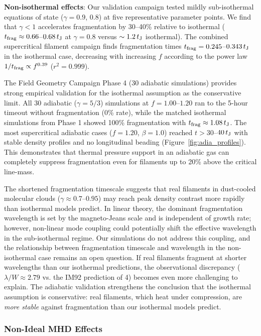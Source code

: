 \documentclass[twoside,twocolumn]{mnras}
\begin{document}
\textbf{Non-isothermal effects}: Our validation campaign tested mildly sub-isothermal equations of state ($\gamma = 0.9$, $0.8$) at five representative parameter points. We find that $\gamma < 1$ accelerates fragmentation by 30--40\% relative to isothermal ($t_{\rm frag} \approx 0.66$--$0.68\,t_{\rm J}$ at $\gamma = 0.8$ versus $\sim 1.2\,t_{\rm J}$ isothermal). The combined supercritical filament campaign finds fragmentation times $t_{\rm frag} = 0.245$--$0.343\,t_{\rm J}$ in the isothermal case, decreasing with increasing $f$ according to the power law $1/t_{\rm frag} \propto f^{0.39}$ ($r^2 = 0.999$).

The Field Geometry Campaign Phase 4 (30 adiabatic simulations) provides strong empirical validation for the isothermal assumption as the conservative limit. All 30 adiabatic ($\gamma = 5/3$) simulations at $f = 1.00$--$1.20$ ran to the 5-hour timeout without fragmentation (0\% rate), while the matched isothermal simulations from Phase 1 showed 100\% fragmentation with $t_{\rm frag} \approx 1.08\,t_{\rm J}$. The most supercritical adiabatic cases ($f = 1.20$, $\beta = 1.0$) reached $t > 30$--$40\,t_{\rm J}$ with stable density profiles and no longitudinal beading (Figure~\ref{fig:adia_profiles}). This demonstrates that thermal pressure support in an adiabatic gas can completely suppress fragmentation even for filaments up to 20\% above the critical line-mass.

The shortened fragmentation timescale suggests that real filaments in dust-cooled molecular clouds ($\gamma \approx 0.7$--$0.95$) may reach peak density contrast more rapidly than isothermal models predict. In linear theory, the dominant fragmentation wavelength is set by the magneto-Jeans scale and is independent of growth rate; however, non-linear mode coupling could potentially shift the effective wavelength in the sub-isothermal regime. Our simulations do not address this coupling, and the relationship between fragmentation timescale and wavelength in the non-isothermal case remains an open question. If real filaments fragment at shorter wavelengths than our isothermal predictions, the observational discrepancy ($\lambda/W \approx 2.79$ vs. the IM92 prediction of 4) becomes even more challenging to explain. The adiabatic validation strengthens the conclusion that the isothermal assumption is conservative: real filaments, which heat under compression, are {\it more stable} against fragmentation than our isothermal models predict.

\subsubsection{Non-Ideal MHD Effects}
\end{document}

